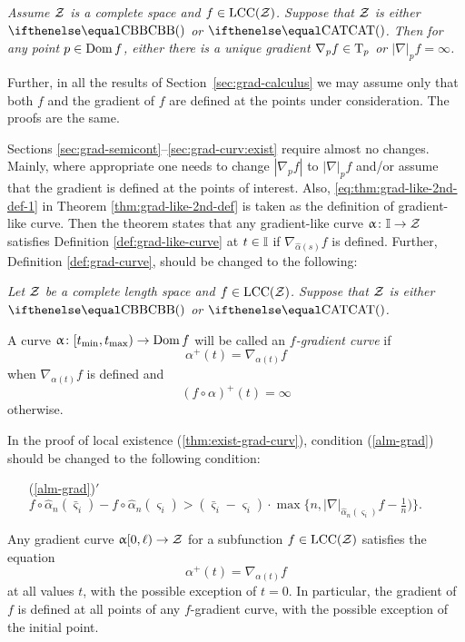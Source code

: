 \textit{Assume $\mathcal{Z}$ is a complete space and $f\in \LSCSC(\spc{Z})$. 
Suppose that $\mathcal{Z}$ is either $\Alex{}$ or $\CAT{}$.
Then for any point $p\in \Dom f$, either there is a unique gradient $\nabla_p f\in \T_p$ 
or $|\nabla|_pf=\infty$.}

\medskip

Further, in all the results of Section~\ref{sec:grad-calculus} 
we may assume only that both $f$ and the gradient of $f$ are defined at the points under consideration. The proofs are the same.

Sections \ref{sec:grad-semicont}--\ref{sec:grad-curv:exist}
require almost no changes.
Mainly, where appropriate
one needs to change $|\nabla_p f|$ 
to $|\nabla|_pf$ 
and/or assume that the gradient is defined at the points of interest.
Also,  \ref{eq:thm:grad-like-2nd-def-1} in Theorem \ref{thm:grad-like-2nd-def}
is taken as the definition of gradient-like curve.
Then the theorem states that any  gradient-like curve $\alpha\:\II\to\spc{Z}$ satisfies Definition \ref{def:grad-like-curve} at $t\in \II$ if $\nabla_{\hat\alpha(s)} f$ is defined.
Further, Definition \ref{def:grad-curve}, should be changed to the following:

\medskip

{\it Let $\mathcal{Z}$ be a complete length space
and $f\in\LSCSC(\spc{Z})$.
Suppose that $\mathcal{Z}$ is either $\Alex{}$ or $\CAT{}$.

A curve 
$\alpha\:[t_{\min},t_{\max})\to\Dom f$ will be called an  \emph{$f$-gradient curve} if
\[\alpha^+(t)=\nabla_{\alpha(t)} f\]
when $\nabla_{\alpha(t)} f$ is defined and 
\[(f\circ\alpha)^+(t)=\infty\]
otherwise.}

\medskip

In the proof of local existence (\ref{thm:exist-grad-curv}), condition (\ref{alm-grad})
should be changed to the following condition:
\begin{itemize}

\item[{(\ref{alm-grad})}$'$]
$f\circ\hat\alpha_n(\bar\varsigma_i)-f\circ\hat\alpha_n(\varsigma_i)
>
(\bar\varsigma_i-\varsigma_i)
\cdot
\max\{n,|\nabla|_{\hat\alpha_n(\varsigma_i)}f-\tfrac{1}{n})\}.$
\end{itemize}

Any gradient curve $\alpha[0,\ell)\to\spc{Z}$
for a subfunction
$f\in \LSCSC(\spc{Z})$
satisfies the equation
\[\alpha^+(t)=\nabla_{\alpha(t)} f\]
at all values $t$, with the possible exception of $t=0$.
In particular, the gradient of $f$ is defined at all points of any 
$f$-gradient curve, with the possible exception of the initial point.

